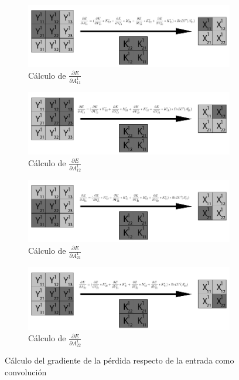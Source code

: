 \begin{figure}[H]
	\centering
	\begin{subfigure}{.5\textwidth}
		\hspace{-25mm}
		\includegraphics[width=1.4\linewidth]{imagenes/conv_back_entrada_pad_1.jpg}  
		\caption{Cálculo de $\frac{\partial E}{\partial A^1_{11}}$}
	\end{subfigure}%
	\begin{subfigure}{.5\textwidth}
		\hspace{5mm}
		\includegraphics[width=1.4\linewidth]{imagenes/conv_back_entrada_pad_2.jpg}  
		\caption{Cálculo de $\frac{\partial E}{\partial A^1_{12}}$}
	\end{subfigure}
	\vspace{5mm}
	\begin{subfigure}{.5\textwidth}
		\hspace{-25mm}
		\includegraphics[width=1.4\linewidth]{imagenes/conv_back_entrada_pad_3.jpg}  
		\caption{Cálculo de $\frac{\partial E}{\partial A^1_{21}}$}
	\end{subfigure}%
	\begin{subfigure}{.5\textwidth}
		\hspace{5mm}
		\includegraphics[width=1.4\linewidth]{imagenes/conv_back_entrada_pad_4.jpg}  
		\caption{Cálculo de $\frac{\partial E}{\partial A^1_{22}}$}
	\end{subfigure}
	\caption{Cálculo del gradiente de la pérdida respecto de la entrada como convolución}
	\label{fig:conv_backprop_como_convolucion_Y_K_pad}
\end{figure}

